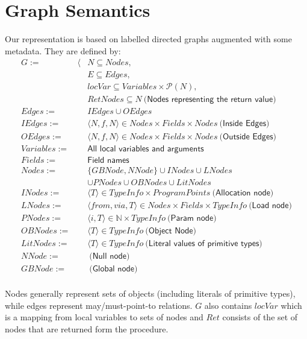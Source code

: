 \section{Graph Semantics}
Our representation is based on labelled directed graphs augmented with some
metadata. They are defined by:
\begin{eqnarray*}
    G           := &\langle& N \subseteq Nodes, \\
                   && E \subseteq Edges, \\
                   && locVar \subseteq Variables \times \mathcal{P}(N), \\
                   && RetNodes \subseteq N ~\textsf{(Nodes representing the return value)}\\
    Edges       := && IEdges \cup OEdges  \\
    IEdges      := && \langle N, f, N \rangle \in Nodes \times Fields \times Nodes ~\textsf{(Inside Edges)} \\
    OEdges      := && \langle N, f, N \rangle \in Nodes \times Fields \times Nodes ~\textsf{(Outside Edges)} \\
    Variables   := && \textsf{All local variables and arguments} \\
    Fields      := && \textsf{Field names} \\
    Nodes       := && \{ GBNode, NNode \} \cup INodes \cup LNodes \\
                   && \cup PNodes \cup OBNodes \cup LitNodes \\
    INodes      := && \langle T \rangle \in TypeInfo \times ProgramPoints ~ \textsf{(Allocation node)} \\
    LNodes      := && \langle from, via, T \rangle \in Nodes \times Fields \times TypeInfo ~ \textsf{(Load node)} \\
    PNodes      := && \langle i, T \rangle  \in \mathbb{N} \times TypeInfo ~ \textsf{(Param node)} \\
    OBNodes     := && \langle T \rangle \in TypeInfo ~ \textsf{(Object Node)} \\
    LitNodes    := && \langle T \rangle \in TypeInfo ~ \textsf{(Literal values of primitive types)} \\
    NNode       := && ~ \textsf{(Null node)} \\
    GBNode      := && ~ \textsf{(Global node)} \\
\end{eqnarray*}

Nodes generally represent sets of objects (including literals of primitive
types), while edges represent may/must-point-to relations. $G$ also contains
$locVar$ which is a mapping from local variables to sets of nodes and $Ret$
consists of the set of nodes that are returned form the procedure.

